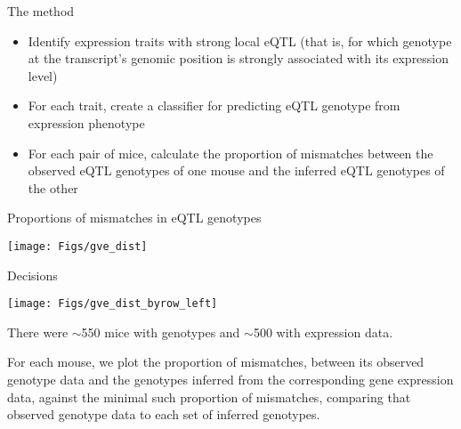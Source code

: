 \documentclass[final,plain]{beamer}
\newlength{\onecolwid}
\begin{document}
\begin{frame}[t]
\begin{columns}[t]
\begin{column}{\onecolwid}
\begin{block}{The method}
\begin{itemize}
\itemsep18pt

\item Identify expression traits with strong local eQTL (that is, for
  which genotype at the transcript's genomic position is strongly
  associated with its expression level)

\item For each trait, create a classifier for predicting eQTL genotype
  from expression phenotype

\item For each pair of mice, calculate the proportion of mismatches
  between the observed eQTL genotypes of one mouse and the inferred
  eQTL genotypes of the other
\end{itemize}

    \end{block}

\vspace{22mm} %

    \begin{block}{Proportions of mismatches in eQTL genotypes}

      \centerline{\texttt{[image: Figs/gve\_dist]}}
    \end{block}


\vspace{22mm} %

    \begin{block}{Decisions}

      \centerline{\texttt{[image: Figs/gve\_dist\_byrow\_left]}}


There were $\sim$550 mice with genotypes and $\sim$500 with
expression data.  

\vspace{18pt}

For each mouse, we plot the proportion of mismatches, between its
observed genotype data and the genotypes inferred from the
corresponding gene expression data, against the minimal such proportion of
mismatches, comparing that observed genotype data to each set of
inferred genotypes.

%

    \end{block}




\end{column}
\end{columns}
\end{frame}
\end{document}
